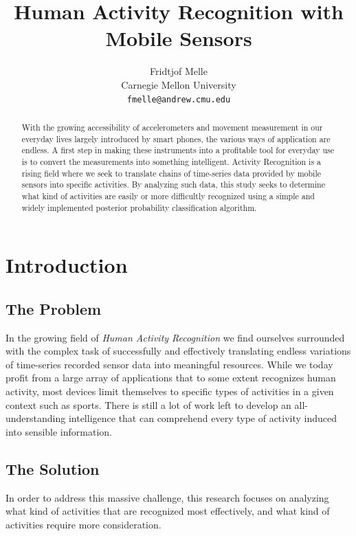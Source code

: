 \documentclass{sig-alternate}
\begin{document}
\title{Human Activity Recognition with Mobile Sensors}

\author{
Fridtjof Melle\\
Carnegie Mellon University\\
{\tt fmelle@andrew.cmu.edu}
}

\maketitle

\begin{abstract}
   With the growing accessibility of accelerometers and movement measurement in our everyday lives largely introduced by smart phones, the various ways of application are endless. A first step in making these instruments into a profitable tool for everyday use is to convert the measurements into something intelligent. Activity Recognition is a rising field where we seek to translate chains of time-series data provided by mobile sensors into specific activities. By analyzing such data, this study seeks to determine what kind of activities are easily or more difficultly recognized using a simple and widely implemented posterior probability classification algorithm.
   
\end{abstract}

\section{Introduction}

\subsection{The Problem}
In the growing field of \textit{Human Activity Recognition} we find ourselves surrounded with the complex task of successfully and effectively translating endless variations of time-series recorded sensor data into meaningful resources. While we today profit from a large array of applications that to some extent recognizes human activity, most devices  limit themselves to specific types of activities in a given context such as sports. There is still a lot of work left to develop an all-understanding intelligence that can comprehend every type of activity induced into sensible information.

\subsection{The Solution}
In order to address this massive challenge, this research focuses on analyzing what kind of activities that are recognized most effectively, and what kind of activities require more consideration.
\end{document}

